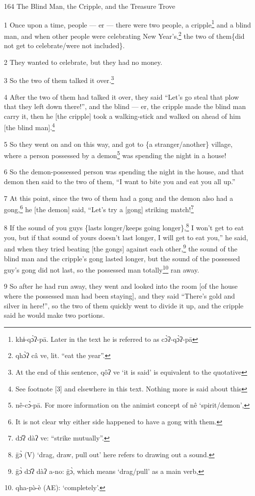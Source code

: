
164 The Blind Man, the Cripple, and the Treasure Trove

1 Once upon a time, people --- er --- there were two people, a cripple\footnote{khɨ-qɔ̀ʔ-pā. Later in the text he is referred to as cɔ̀ʔ-qɔ̀ʔ-pā} and a
blind man, and when other people were celebrating New Year's,\footnote{qhɔ̀ʔ câ ve, lit. ``eat the year''.} the two of them\{did
not get to celebrate/were not included\}.

2 They wanted to celebrate, but they had no money.

3 So the two of them talked it over.\footnote{At the end of this sentence, qôʔ ve `it is said' is equivalent to the quotative}

4 After the two of them had talked it over, they said ``Let's go steal that plow
that they left down there!'', and the blind --- er, the cripple made the blind
man carry it, then he [the cripple] took a walking-stick and walked on ahead of
him [the blind man].\footnote{See footnote [3] and elsewhere in this text. Nothing more is said about this}

5 So they went on and on this way, and got to \{a stranger/another\} village, where
a person possessed by a demon\footnote{nê-cɔ̀-pā. For more information on the animist concept of nê `spirit/demon',} was spending the night in a house!

6 So the demon-possessed person was spending the night in the house, and that demon
then said to the two of them, ``I want to bite you and eat you all up.''

7 At this point, since the two of them had a gong and the demon also had a gong,\footnote{It is not clear why either side happened to have a gong with them.}
he [the demon] said, ``Let's try a [gong] striking match!\footnote{dɔ̂ʔ dàʔ ve: ``strike mutually''.}

8 If the sound of you guys \{lasts longer/keeps going longer\},\footnote{g̈ɔ̀ (V) `drag, draw, pull out' here refers to drawing out a sound.} I won't get
to eat you, but if that sound of yours doesn't last longer, I will get to eat you,''
he said, and when they tried beating [the gongs] against each other,\footnote{g̈ɔ̀ dɔ̂ʔ dàʔ a-no: g̈ɔ̀, which means `drag/pull' as a main verb,} the sound
of the blind man and the cripple's gong lasted longer, but the sound of the possessed
guy's gong did not last, so the possessed man totally\footnote{qha-pə̀-è (AE): `completely'.} ran away.

9 So after he had run away, they went and looked into the room [of the house where
the possessed man had been staying], and they said ``There's gold and silver in
here!'', so the two of them quickly went to divide it up, and the cripple said
he would make two portions.

